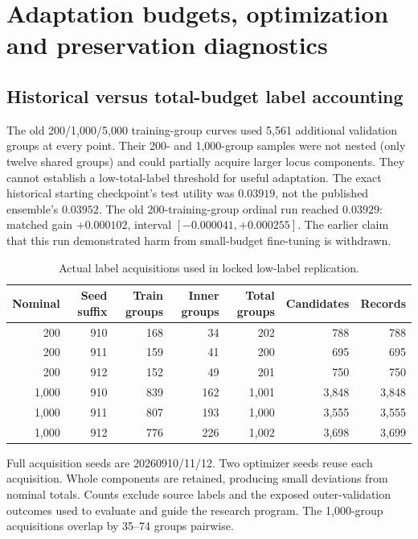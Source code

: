 \section{Adaptation budgets, optimization and preservation diagnostics}
\subsection{Historical versus total-budget label accounting}
The old 200/1,000/5,000 training-group curves used 5,561 additional validation groups at every point. Their 200- and 1,000-group samples were not nested (only twelve shared groups) and could partially acquire larger locus components. They cannot establish a low-total-label threshold for useful adaptation. The exact historical starting checkpoint's test utility was $0.03919$, not the published ensemble's $0.03952$. The old 200-training-group ordinal run reached $0.03929$: matched gain $+0.000102$, interval $[-0.000041,+0.000255]$. The earlier claim that this run demonstrated harm from small-budget fine-tuning is withdrawn.

\begin{table}[htbp]
\centering\small
\caption{Actual label acquisitions used in locked low-label replication.}
\label{tab:budgets}
\begin{tabular}{rrrrrrr}
\toprule
Nominal & Seed suffix & Train groups & Inner groups & Total groups & Candidates & Records \\
\midrule
200 & 910 & 168 & 34 & 202 & 788 & 788 \\
200 & 911 & 159 & 41 & 200 & 695 & 695 \\
200 & 912 & 152 & 49 & 201 & 750 & 750 \\
1,000 & 910 & 839 & 162 & 1,001 & 3,848 & 3,848 \\
1,000 & 911 & 807 & 193 & 1,000 & 3,555 & 3,555 \\
1,000 & 912 & 776 & 226 & 1,002 & 3,698 & 3,699 \\
\bottomrule
\end{tabular}
\par\smallskip\begin{minipage}{\linewidth}\footnotesize
Full acquisition seeds are 20260910/11/12. Two optimizer seeds reuse each acquisition. Whole components are retained, producing small deviations from nominal totals. Counts exclude source labels and the exposed outer-validation outcomes used to evaluate and guide the research program. The 1,000-group acquisitions overlap by 35--74 groups pairwise.
\end{minipage}
\end{table}

